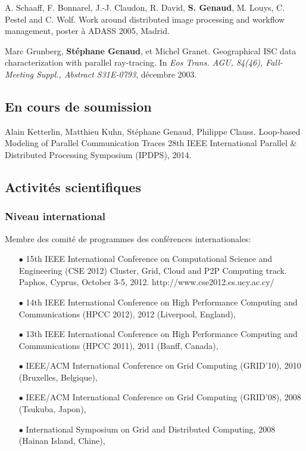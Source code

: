 \documentclass[11pt]{article}
\begin{document}
\begin{thebibliography}{99}
A. Schaaff, F. Bonnarel, J.-J. Claudon, R. David, \textbf{S. Genaud}, M. Louys, 
C. Pestel and C. Wolf.
\newblock Work around distributed image processing and workflow management, 
\newblock poster à ADASS 2005, Madrid.


Marc Grunberg, \textbf{Stéphane Genaud}, et Michel Granet.
\newblock Geographical {ISC} data characterization with parallel ray-tracing.
\newblock In {\em Eos Trans. AGU, 84(46), Fall-Meeting Suppl., Abstract
  S31E-0793}, décembre 2003.


\subsection*{En cours de soumission}


Alain Ketterlin, Matthieu Kuhn, Stéphane Genaud, Philippe Clauss.
\newblock Loop-based Modeling of Parallel Communication Traces
\newblock 28th IEEE International Parallel \& Distributed Processing Symposium (IPDPS),
2014.

\end{thebibliography}


\newpage
\subsectionfont{\sectionrule{3ex}{0pt}{-1ex}{1pt}}



\subsection{Activités scientifiques}

\subsubsection{Niveau international}
Membre des comité de programmes des conférences internationales:\\[-3mm]
\begin{itemize}
\item[$\bullet$]
15th IEEE International Conference on Computational Science and Engineering (CSE 2012) 
Cluster, Grid, Cloud and P2P Computing track. Paphos, Cyprus, October 3-5, 2012. 
http://www.cse2012.cs.ucy.ac.cy/

\item[$\bullet$] 
14th IEEE International Conference on High Performance Computing and Communications (HPCC 2012), 
2012 (Liverpool, England),
\item[$\bullet$] 
13th IEEE International Conference on High Performance Computing and Communications (HPCC 2011), 
2011 (Banff, Canada),
\item[$\bullet$] 
IEEE/ACM International Conference on Grid Computing (GRID'10), 2010 (Bruxelles, Belgique),
\item[$\bullet$] 
IEEE/ACM International Conference on Grid Computing (GRID'08), 2008 (Tsukuba, Japon), 
\item [$\bullet$]
International Symposium on Grid and Distributed Computing, 2008 (Hainan Island, Chine),\\
\end{itemize}
\end{document}
